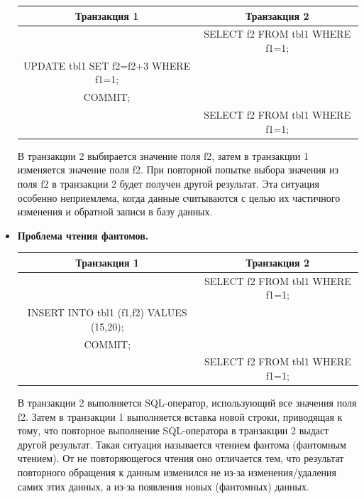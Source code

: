 \begin{itemize}[label=---]
	\begin{table}[ht!]
		\begin{center}
			\label{tbl:pr1}
			\begin{tabular}{|c|c|}
				\hline
				Транзакция 1 & Транзакция 2 \\
				\hline
				& SELECT f2 FROM tbl1 WHERE f1=1; \\
				UPDATE tbl1 SET f2=f2+3 WHERE f1=1; & \\
				COMMIT; & \\
				& SELECT f2 FROM tbl1 WHERE f1=1; \\
				\hline
			\end{tabular}
		\end{center}
	\end{table}
	В транзакции 2 выбирается значение поля f2, затем в транзакции 1 изменяется значение поля f2.
	При повторной попытке выбора значения из поля f2 в транзакции 2 будет получен другой результат.
	Эта ситуация особенно неприемлема, когда данные считываются с целью их частичного изменения и
	обратной записи в базу данных.
	
	\item \textbf{Проблема чтения фантомов.}
	\begin{table}[ht!]
		\begin{center}
			\label{tbl:pr1}
			\begin{tabular}{|c|c|}
				\hline
				Транзакция 1 & Транзакция 2 \\
				\hline
				& SELECT f2 FROM tbl1 WHERE f1=1; \\
				INSERT INTO tbl1 (f1,f2) VALUES (15,20); & \\
				COMMIT; & \\
				& SELECT f2 FROM tbl1 WHERE f1=1; \\
				\hline
			\end{tabular}
		\end{center}
	\end{table}
	В транзакции 2 выполняется SQL-оператор, использующий все значения поля f2. Затем в транзакции
	1 выполняется вставка новой строки, приводящая к тому, что повторное выполнение SQL-оператора
	в транзакции 2 выдаст другой результат. Такая ситуация называется чтением фантома (фантомным
	чтением). От не повторяющегося чтения оно отличается тем, что результат повторного обращения к
	данным изменился не из-за изменения/удаления самих этих данных, а из-за появления новых (фантомных) данных.
\end{itemize}

